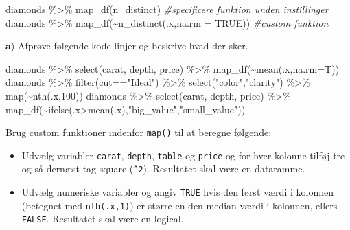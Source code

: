 \documentclass[
]{book}
\newenvironment{Shaded}{\begin{snugshade}}{\end{snugshade}}
\newcommand{\AttributeTok}[1]{\textcolor[rgb]{0.77,0.63,0.00}{#1}}
\newcommand{\CommentTok}[1]{\textcolor[rgb]{0.56,0.35,0.01}{\textit{#1}}}
\newcommand{\ConstantTok}[1]{\textcolor[rgb]{0.00,0.00,0.00}{#1}}
\newcommand{\DecValTok}[1]{\textcolor[rgb]{0.00,0.00,0.81}{#1}}
\newcommand{\FunctionTok}[1]{\textcolor[rgb]{0.00,0.00,0.00}{#1}}
\newcommand{\NormalTok}[1]{#1}
\newcommand{\SpecialCharTok}[1]{\textcolor[rgb]{0.00,0.00,0.00}{#1}}
\newcommand{\StringTok}[1]{\textcolor[rgb]{0.31,0.60,0.02}{#1}}
\providecommand{\tightlist}{%
  \setlength{\itemsep}{0pt}\setlength{\parskip}{0pt}}
\begin{document}
\begin{Shaded}
\begin{Highlighting}[]
\NormalTok{diamonds }\SpecialCharTok{\%\textgreater{}\%} \FunctionTok{map\_df}\NormalTok{(n\_distinct) }\CommentTok{\#specificere funktion unden instillinger}
\NormalTok{diamonds }\SpecialCharTok{\%\textgreater{}\%} \FunctionTok{map\_df}\NormalTok{(}\SpecialCharTok{\textasciitilde{}}\FunctionTok{n\_distinct}\NormalTok{(.x,}\AttributeTok{na.rm =} \ConstantTok{TRUE}\NormalTok{)) }\CommentTok{\#custom funktion}
\end{Highlighting}
\end{Shaded}

\textbf{a}) Afprøve følgende kode linjer og beskrive hvad der sker.

\begin{Shaded}
\begin{Highlighting}[]
\NormalTok{diamonds }\SpecialCharTok{\%\textgreater{}\%} \FunctionTok{select}\NormalTok{(carat, depth, price) }\SpecialCharTok{\%\textgreater{}\%} \FunctionTok{map\_df}\NormalTok{(}\SpecialCharTok{\textasciitilde{}}\FunctionTok{mean}\NormalTok{(.x,}\AttributeTok{na.rm=}\NormalTok{T))}
\NormalTok{diamonds }\SpecialCharTok{\%\textgreater{}\%} \FunctionTok{filter}\NormalTok{(cut}\SpecialCharTok{==}\StringTok{"Ideal"}\NormalTok{) }\SpecialCharTok{\%\textgreater{}\%} \FunctionTok{select}\NormalTok{(}\StringTok{"color"}\NormalTok{,}\StringTok{"clarity"}\NormalTok{) }\SpecialCharTok{\%\textgreater{}\%} \FunctionTok{map}\NormalTok{(}\SpecialCharTok{\textasciitilde{}}\FunctionTok{nth}\NormalTok{(.x,}\DecValTok{100}\NormalTok{))}
\NormalTok{diamonds }\SpecialCharTok{\%\textgreater{}\%} \FunctionTok{select}\NormalTok{(carat, depth, price) }\SpecialCharTok{\%\textgreater{}\%} \FunctionTok{map\_df}\NormalTok{(}\SpecialCharTok{\textasciitilde{}}\FunctionTok{ifelse}\NormalTok{(.x}\SpecialCharTok{\textgreater{}}\FunctionTok{mean}\NormalTok{(.x),}\StringTok{"big\_value"}\NormalTok{,}\StringTok{"small\_value"}\NormalTok{))}
\end{Highlighting}
\end{Shaded}

Brug custom funktioner indenfor \texttt{map()} til at beregne følgende:

\begin{itemize}
\tightlist
\item
  Udvælg variabler \texttt{carat}, \texttt{depth}, \texttt{table} og \texttt{price} og for hver kolonne tilføj tre og så dernæst tag square (\texttt{\^{}2}). Resultatet skal være en dataramme.
\item
  Udvælg numeriske variabler og angiv \texttt{TRUE} hvis den først værdi i kolonnen (betegnet med \texttt{nth(.x,1)}) er større en den median værdi i kolonnen, ellers \texttt{FALSE}. Resultatet skal være en logical.
\end{itemize}
\end{document}
